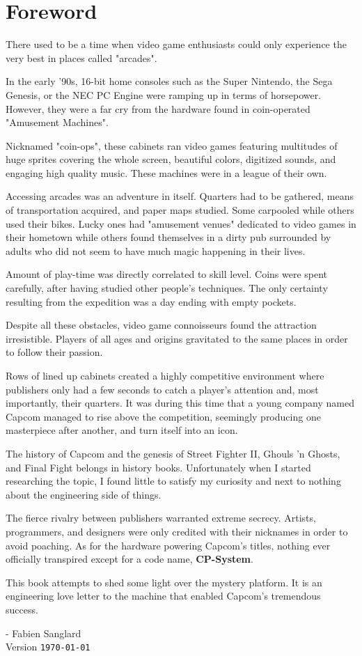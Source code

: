 \chapter*{Foreword}

There used to be a time when video game enthusiasts could only experience the very best in places called "arcades". 

In the early '90s, 16-bit home consoles such as the Super Nintendo, the Sega Genesis, or the NEC PC Engine were ramping up in terms of horsepower. However, they were a far cry from the hardware found in coin-operated "Amusement Machines".

Nicknamed "coin-ops", these cabinets ran video games featuring multitudes of huge sprites covering the whole screen, beautiful colors, digitized sounds, and engaging high quality music. These machines were in a league of their own.

Accessing arcades was an adventure in itself. Quarters had to be gathered, means of transportation acquired, and paper maps studied. Some carpooled while others used their bikes. Lucky ones had "amusement venues" dedicated to video games in their hometown while others found themselves in a dirty pub surrounded by adults who did not seem to have much magic happening in their lives. 

Amount of play-time was directly correlated to skill level. Coins were spent carefully, after having studied other people's techniques. The only certainty resulting from the expedition was a day ending with empty pockets. 

Despite all these obstacles, video game connoisseurs found the attraction irresistible. Players of all ages and origins gravitated to the same places in order to follow their passion. 

Rows of lined up cabinets created a highly competitive environment where publishers only had a few seconds to catch a player's attention and, most importantly, their quarters. It was during this time that a young company named Capcom  managed to rise above the competition, seemingly producing one masterpiece after another, and turn itself into an icon.

The history of Capcom and the genesis of Street Fighter II, Ghouls 'n Ghosts, and Final Fight belongs in history books. Unfortunately when I started researching the topic, I found little to satisfy my curiosity and next to nothing about the engineering side of things. 

The fierce rivalry between publishers warranted extreme secrecy. Artists, programmers, and designers were only credited with their nicknames in order to avoid poaching. As for the hardware powering Capcom's titles, nothing ever officially transpired except for a code name, \textbf{CP-System}.

This book attempts to shed some light over the mystery platform. It is an engineering love letter to the machine that enabled Capcom's tremendous success. 

- Fabien Sanglard\\

 Version \texttt{\monthyeardate\today}

